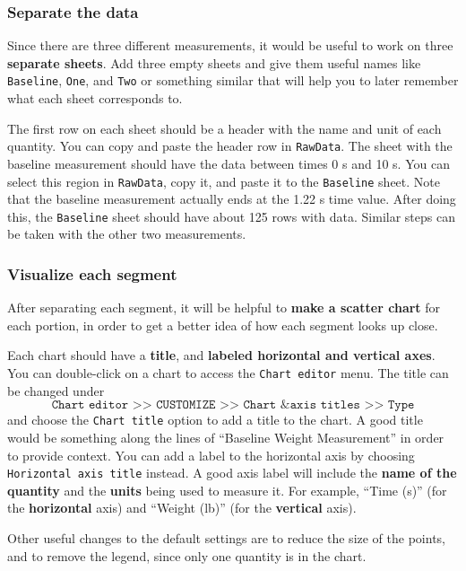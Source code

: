 \subsubsection{Separate the data}
%
Since there are three different measurements, it would be useful to work on three \textbf{separate sheets}. Add three empty sheets and give them useful names like \texttt{Baseline}, \texttt{One}, and \texttt{Two} or something similar that will help you to later remember what each sheet corresponds to.

The first row on each sheet should be a header with the name and unit of each quantity. You can copy and paste the header row in \texttt{RawData}. The sheet with the baseline measurement should have the data between times 0 s and 10 s. You can select this region in \texttt{RawData}, copy it, and paste it to the \texttt{Baseline} sheet. Note that the baseline measurement actually ends at the 1.22 s time value. After doing this, the \texttt{Baseline} sheet should have about 125 rows with data. Similar steps can be taken with the other two measurements.
%
\subsubsection{Visualize each segment}
%
After separating each segment, it will be helpful to \textbf{make a scatter chart} for each portion, in order to get a better idea of how each segment looks up close.

Each chart should have a \textbf{title}, and \textbf{labeled horizontal and vertical axes}. You can double-click on a chart to access the \texttt{Chart editor} menu. The title can be changed under
\begin{equation}
    \texttt{Chart editor >> CUSTOMIZE >> Chart \& axis titles >> Type}
\end{equation}
and choose the \texttt{Chart title} option to add a title to the chart. A good title would be something along the lines of ``Baseline Weight Measurement'' in order to provide context. You can add a label to the horizontal axis by choosing \texttt{Horizontal axis title} instead. A good axis label will include the \textbf{name of the quantity} and the \textbf{units} being used to measure it. For example, ``Time (s)'' (for the \textbf{horizontal} axis) and ``Weight (lb)'' (for the \textbf{vertical} axis).

Other useful changes to the default settings are to reduce the size of the points, and to remove the legend, since only one quantity is in the chart.
%
